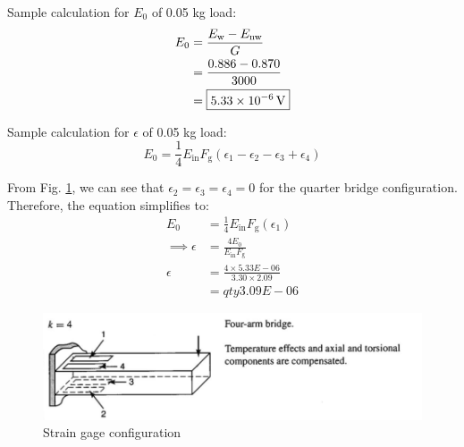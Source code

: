 Sample calculation for $E_0$ of 0.05 kg load:
\begin{align*}
    E_0 &= \frac{E_{\text{w}} - E_{\text{nw}}}{G} \\
    &= \frac{0.886 - 0.870}{3000} \\ 
    &= \boxed{\qty{5.33E-06}{\volt}}
\end{align*}

Sample calculation for $\epsilon$ of 0.05 kg load:
\begin{equation}
    E_0 = \frac{1}{4} E_{\text{in}} F_{\text{g}}
    (\epsilon_1 - \epsilon_2 - \epsilon_3 + \epsilon_4) \label{eq:epsilon}
\end{equation}

From Fig. \ref{fig:strain gage}, we can see that $\epsilon_2 = \epsilon_3 = \epsilon_4 = 0$ for the quarter bridge configuration. Therefore, the equation simplifies to:
\begin{align*}
    E_0 &= \frac{1}{4} E_{\text{in}} F_{\text{g}}
    (\epsilon_1) \\
    \implies \epsilon &= \frac{4 E_0}{E_{\text{in}} F_{\text{g}}} \\
    \epsilon &= \frac{4 \times 5.33E-06}{3.30 \times 2.09} \\
     &= \boxed{qty{3.09E-06}{}}
\end{align*}


\begin{figure}[h]
    \centering
    \includegraphics[width=0.5\linewidth]{Sections/Figures/strain gage.png}
    \caption{Strain gage configuration}
    \label{fig:strain gage}
\end{figure}

